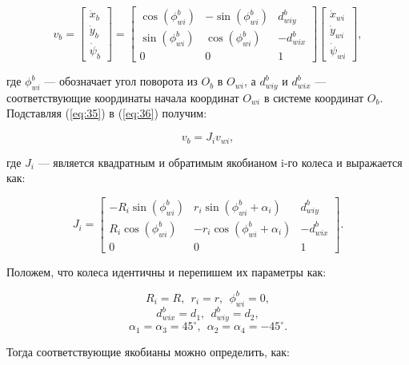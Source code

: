 \documentclass[14pt, a4paper]{extreport}
\begin{document}
\begin{equation}
v_{b} = 
\begin{bmatrix}
\dot{x}_b\\[1mm] \dot{y}_b\\[1mm] \dot{\psi}_b
\end{bmatrix} = 
\begin{bmatrix}
\cos(\phi_{wi}^b) & -\sin(\phi_{wi}^b) & d_{wiy}^b\\[1mm]
\sin(\phi_{wi}^b) & \cos(\phi_{wi}^b) & -d_{wix}^b\\[1mm]
0 & 0 & 1
\end{bmatrix}
\begin{bmatrix}
\dot{x}_{wi}\\[1mm] \dot{y}_{wi}\\[1mm] \dot{\psi}_{wi}
\end{bmatrix}\!,
\tag{36} \label{eq:36}
\end{equation}

\noindent
где $\phi_{wi}^b$ --- обозначает угол поворота из $O_b$ в $O_{wi}$, а $d_{wiy}^b$ и $d_{wix}^b$ ---соответствующие координаты начала координат $O_{wi}$ в системе координат $O_b$. Подставляя (\ref{eq:35}) в (\ref{eq:36}) получим:

\begin{equation}
v_{b} = J_i v_{wi},
\tag{37} \label{eq:37}
\end{equation}

\noindent
где $J_i$ --- является квадратным и обратимым якобианом i-го колеса и выражается как:

\begin{equation}
J_i = 
\begin{bmatrix}
-R_i\sin(\phi_{wi}^b) & r_i\sin(\phi_{wi}^b + \alpha_i) & d_{wiy}^b\\[1mm]
R_i\cos(\phi_{wi}^b) & -r_i\cos(\phi_{wi}^b + \alpha_i) & -d_{wix}^b\\[1mm]
0 & 0 & 1
\end{bmatrix}\!.
\tag{38} \label{eq:38}
\end{equation}

Положем, что колеса идентичны и перепишем их параметры как:

\[
R_i = R,\ \ r_i = r,\ \ \phi_{wi}^b = 0,
\]
\newpage
\[
d_{wix}^b = d_1,\ \ d_{wiy}^b = d_2,
\]
\[
\alpha_1 = \alpha_3 = 45^{\circ},\ \ \alpha_2 = \alpha_4 = -45^{\circ}.
\]

Тогда соответствующие якобианы можно определить, как:
\end{document}
